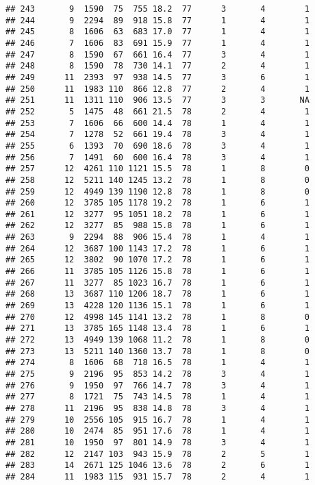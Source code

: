 \documentclass{article}\usepackage[]{graphicx}\usepackage[]{color}
\makeatletter
\newenvironment{kframe}{%
 \def\at@end@of@kframe{}%
 \ifinner\ifhmode%
  \def\at@end@of@kframe{\end{minipage}}%
  \begin{minipage}{\columnwidth}%
 \fi\fi%
 \def\FrameCommand##1{\hskip\@totalleftmargin \hskip-\fboxsep
 \colorbox{shadecolor}{##1}\hskip-\fboxsep
     \hskip-\linewidth \hskip-\@totalleftmargin \hskip\columnwidth}%
 \MakeFramed {\advance\hsize-\width
   \@totalleftmargin\z@ \linewidth\hsize
   \@setminipage}}%
 {\par\unskip\endMakeFramed%
 \at@end@of@kframe}
\newenvironment{knitrout}{}{} %
\makeatother
\begin{document}
\begin{knitrout}
\begin{kframe}
\begin{verbatim}
## 243       9  1590  75  755 18.2  77      3       4        1
## 244       9  2294  89  918 15.8  77      1       4        1
## 245       8  1606  63  683 17.0  77      1       4        1
## 246       7  1606  83  691 15.9  77      1       4        1
## 247       8  1590  67  661 16.4  77      3       4        1
## 248       8  1590  78  730 14.1  77      2       4        1
## 249      11  2393  97  938 14.5  77      3       6        1
## 250      11  1983 110  866 12.8  77      2       4        1
## 251      11  1311 110  906 13.5  77      3       3       NA
## 252       5  1475  48  661 21.5  78      2       4        1
## 253       7  1606  66  600 14.4  78      1       4        1
## 254       7  1278  52  661 19.4  78      3       4        1
## 255       6  1393  70  690 18.6  78      3       4        1
## 256       7  1491  60  600 16.4  78      3       4        1
## 257      12  4261 110 1121 15.5  78      1       8        0
## 258      12  5211 140 1245 13.2  78      1       8        0
## 259      12  4949 139 1190 12.8  78      1       8        0
## 260      12  3785 105 1178 19.2  78      1       6        1
## 261      12  3277  95 1051 18.2  78      1       6        1
## 262      12  3277  85  988 15.8  78      1       6        1
## 263       9  2294  88  906 15.4  78      1       4        1
## 264      12  3687 100 1143 17.2  78      1       6        1
## 265      12  3802  90 1070 17.2  78      1       6        1
## 266      11  3785 105 1126 15.8  78      1       6        1
## 267      11  3277  85 1023 16.7  78      1       6        1
## 268      13  3687 110 1206 18.7  78      1       6        1
## 269      13  4228 120 1136 15.1  78      1       6        1
## 270      12  4998 145 1141 13.2  78      1       8        0
## 271      13  3785 165 1148 13.4  78      1       6        1
## 272      13  4949 139 1068 11.2  78      1       8        0
## 273      13  5211 140 1360 13.7  78      1       8        0
## 274       8  1606  68  718 16.5  78      1       4        1
## 275       9  2196  95  853 14.2  78      3       4        1
## 276       9  1950  97  766 14.7  78      3       4        1
## 277       8  1721  75  743 14.5  78      1       4        1
## 278      11  2196  95  838 14.8  78      3       4        1
## 279      10  2556 105  915 16.7  78      1       4        1
## 280      10  2474  85  951 17.6  78      1       4        1
## 281      10  1950  97  801 14.9  78      3       4        1
## 282      12  2147 103  943 15.9  78      2       5        1
## 283      14  2671 125 1046 13.6  78      2       6        1
## 284      11  1983 115  931 15.7  78      2       4        1

\end{verbatim}
\end{kframe}
\end{knitrout}
\end{document}
